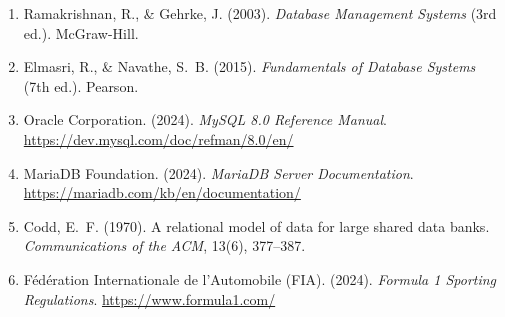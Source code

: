 \documentclass[13pt, a4paper]{report}
\begin{document}
\begin{enumerate}[leftmargin=1.5cm]
  \item Ramakrishnan, R., \& Gehrke, J. (2003). \textit{Database Management Systems} (3rd ed.). McGraw-Hill.
  \item Elmasri, R., \& Navathe, S.~B. (2015). \textit{Fundamentals of Database Systems} (7th ed.). Pearson.
  \item Oracle Corporation. (2024). \textit{MySQL 8.0 Reference Manual}. \url{https://dev.mysql.com/doc/refman/8.0/en/}
  \item MariaDB Foundation. (2024). \textit{MariaDB Server Documentation}. \url{https://mariadb.com/kb/en/documentation/}
  \item Codd, E.~F. (1970). A relational model of data for large shared data banks. \textit{Communications of the ACM}, 13(6), 377--387.
  \item Fédération Internationale de l'Automobile (FIA). (2024). \textit{Formula 1 Sporting Regulations}. \url{https://www.formula1.com/}
\end{enumerate}
\end{document}
